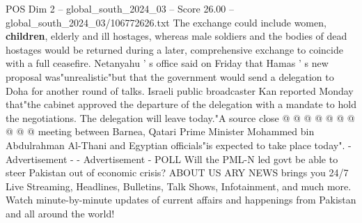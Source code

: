 \begin{textsample}{POS Dim 2 – global\_south\_2024\_03 – Score 26.00 – global\_south\_2024\_03/106772626.txt}
The exchange could include women, \textbf{children}, elderly and ill hostages, whereas male soldiers and the bodies of dead hostages would be returned during a later, comprehensive exchange to coincide with a full ceasefire.
Netanyahu ' s office said on Friday that Hamas ' s new proposal was"unrealistic"but that the government would send a delegation to Doha for another round of talks.
Israeli public broadcaster Kan reported Monday that"the cabinet approved the departure of the delegation with a mandate to hold the negotiations.
The delegation will leave today."A source close @ @ @ @ @ @ @ @ @ @ meeting between Barnea, Qatari Prime Minister Mohammed bin Abdulrahman Al-Thani and Egyptian officials"is expected to take place today". - Advertisement - - Advertisement - POLL Will the PML-N led govt be able to steer Pakistan out of economic crisis?
ABOUT US ARY NEWS brings you 24/7 Live Streaming, Headlines, Bulletins, Talk Shows, Infotainment, and much more.
Watch minute-by-minute updates of current affairs and happenings from Pakistan and all around the world!

\end{textsample}
